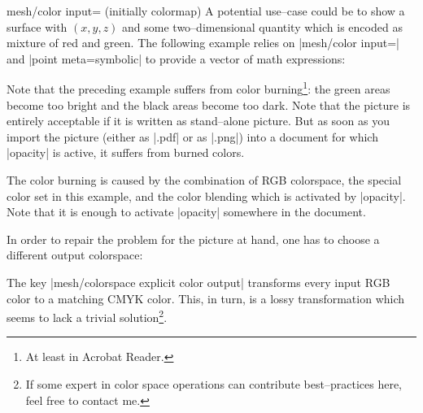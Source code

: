 {{\begin{pgfplotskey}{mesh/color input= (initially colormap)}
A potential use--case could be to show a surface with $(x,y,z)$ and some two--dimensional quantity which is encoded as mixture of red and green. The following example relies on |mesh/color input=| and |point meta=symbolic| to provide a vector of math expressions:
\pgfplotsexpensiveexample
\begin{codeexample}[]
\end{codeexample}
\noindent Note that the preceding example suffers from color burning\footnote{At least in Acrobat Reader.}: the green areas become too bright and the black areas become too dark. Note that the picture is entirely acceptable if it is written as stand--alone picture. But as soon as you import the picture (either as |.pdf| or as |.png|) into a document for which |opacity| is active, it suffers from burned colors. 

The color burning is caused by the combination of RGB colorspace, the special color set in this example, and the color blending which is activated by |opacity|. Note that it is enough to activate |opacity| somewhere in the document. 

In order to repair the problem for the picture at hand, one has to choose a different output colorspace:

\pgfplotsexpensiveexample
\begin{codeexample}[]
\end{codeexample}
\noindent The key |mesh/colorspace explicit color output| transforms every input RGB color to a matching CMYK color. This, in turn, is a lossy transformation which seems to lack a trivial solution\footnote{If some expert in color space operations can contribute best--practices here, feel free to contact me.}.



\end{pgfplotskey}}}
